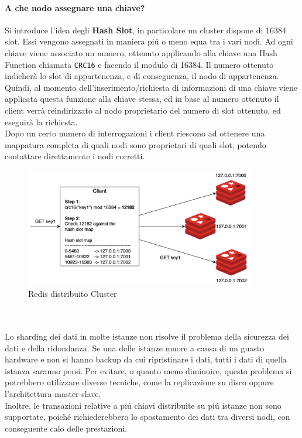 \paragraph{A che nodo assegnare una chiave?\\}
Si introduce l'idea degli \textbf{Hash Slot}, in particolare un cluster dispone di 16384 slot.
Essi vengono assegnati in maniera piú o meno equa tra i vari nodi.
Ad ogni chiave viene associato un numero, ottenuto applicando alla chiave una Hash Function chiamata \texttt{CRC16}
e facendo il modulo di 16384.
Il numero ottenuto indicherà lo slot di appartenenza, e di conseguenza, il nodo di appartenenza.
Quindi, al momento dell'inserimento/richiesta di informazioni di una chiave viene applicata questa funzione alla chiave stessa,
ed in base al numero ottenuto il client verrà reindirizzato al nodo proprietario del numero di slot ottenuto, ed eseguirà la richiesta.\\
Dopo un certo numero di interrogazioni i client riescono ad ottenere una mappatura completa di quali nodi sono proprietari di quali slot,
potendo contattare direttamente i nodi corretti.
\begin{figure}[H]
    \begin{center}
        \includegraphics[width=0.9\textwidth]{img/hashslotCluster}
    \end{center}
\caption{Redis distribuito Cluster}
\end{figure}\\
\\
Lo sharding dei dati in molte istanze non risolve il problema della sicurezza dei dati e della ridondanza. Se una delle istanze muore
a causa di un guasto hardware e non si hanno backup da cui ripristinare i dati, tutti i dati di quella istanza saranno persi.
Per evitare, o quanto meno diminuire, questo problema si potrebbero utilizzare diverse tecniche, come la replicazione su disco oppure l'architettura master-slave.\\
Inoltre, le transazioni relative a piú chiavi distribuite su piú istanze non sono supportate, poiché richiederebbero lo spostamento
dei dati tra diversi nodi, con conseguente calo delle prestazioni.\\
\\


